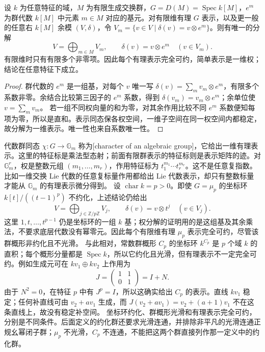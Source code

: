 \begin{theorem}\label{b5:thm:torus-weight-decomposition}
	设 \(k\) 为任意特征的域，\(M\) 为有限生成交换群，\(G=D(M)=\operatorname{Spec}k[M]\)，\(e^m\) 为群代数 \(k[M]\) 中元素 \(m\in M\) 对应的基元。对有限维有理 \(G\) 表示，以及更一般的任意右 \(k[M]\) 余模 \((V,\delta)\)，令 \(V_m=\{v\in V\mid\delta(v)=v\otimes e^m\}\)。则有唯一的分解
	\[
		V=\bigoplus_{m\in M}V_m,\qquad \delta(v)=v\otimes e^m\quad(v\in V_m).
	\]
	有限维时只有有限多个非零项。因此每个有理表示完全可约，简单表示是一维权；结论在任意特征下成立。
\end{theorem}
\begin{proof}
	群代数的 \(e^m\) 是一组基，对每个 \(v\) 唯一写 \(\delta(v)=\sum_m v_m\otimes e^m\)，有限多个系数非零。余结合比较第三因子的 \(e^m\) 系数，得到 \(\delta(v_m)=v_m\otimes e^m\)；余单位使 \(v=\sum_m v_m\)。 若一组不同权向量的和为零，对其余作用比较不同 \(e^m\) 系数便知每项为零，所以是直和。表示同态保各权空间，一维子空间在同一权空间内都稳定，故分解为一维表示。唯一性也来自系数唯一性。
\end{proof}
代数群同态 \(\chi:G\to\mathbb G_m\) 称为[character of an algebraic group]，它给出一维有理表示。这里的特征标是乘法型态射；前面有限群表示的特征标则是表示矩阵的迹。对 \(\mathbb G_m^r\)，权是整数元组 \((m_1,\ldots,m_r)\)，作用特征标为 \(t_1^{m_1}\cdots t_r^{m_r}\)。这不是任意复指数。比如一维交换 Lie 代数的任意复标量作用都给出 Lie 代数表示，却只有整数标量才能从 \(\mathbb G_m\) 的有理表示微分得到。
\ProseParagraphBreak
设 \(\operatorname{char}k=p>0\)。即使 \(G=\mu_p\) 的坐标环 \(k[t]/((t-1)^p)\) 不约化，上述结论仍给出
\[
	V=\bigoplus_{j\in\mathbb Z/p\mathbb Z}V_j,\qquad \delta(v)=v\otimes t^j\quad(v\in V_j).
\]
这里 \(1,t,\ldots,t^{p-1}\) 仍是坐标环的一组 \(k\) 基；权分解的证明用的是这组基及其余乘法，不要求底层代数没有幂零元。因此每个有限维有理 \(\mu_p\) 表示完全可约，尽管该群概形非约化且不光滑。
\ProseParagraphBreak
与此相对，常数群概形 \(C_p\) 的坐标环 \(k^{C_p}\) 是 \(p\) 个域 \(k\) 的直积；每个概形分量都是 \(\operatorname{Spec}k\)，所以它约化且光滑，但有理表示不一定完全可约。例如生成元可在 \(kv_1\oplus kv_2\) 上作用为
\[
	J=\begin{pmatrix}1&1\\0&1\end{pmatrix}=I+N.
\]
由于 \(N^2=0\)，在特征 \(p\) 中有 \(J^p=I\)，所以这确实给出 \(C_p\) 的表示。直线 \(kv_1\) 稳定；任何补直线可由 \(v_2+av_1\) 生成，而 \(J(v_2+av_1)=v_2+(a+1)v_1\) 不在这条直线上，故没有稳定补空间。
\ProseParagraphBreak
坐标环约化、群概形光滑和有理表示完全可约，分别是不同条件。后面定义的约化群还要求光滑连通，并排除非平凡的光滑连通正规幺幂闭子群；\(\mu_p\) 不光滑，\(C_p\) 不连通，不能把这两个群直接列作那一定义中的约化群。

